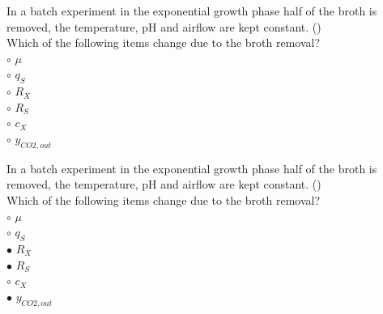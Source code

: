 \documentclass[]{beamer}
\begin{document}
\begin{frame}[shrink] {}
\color{blue}
In a batch experiment in the exponential growth phase half of the broth is removed, the temperature, pH and airflow are kept constant.
({\color{red}{Q7}})\\
Which of the following items change due to the broth removal?
\\
\color{black}
\setlength{\parindent}{-0.4cm}
{\color{red}$\circ$} $\mu$  \\
{\color{red}$\circ$} $q_{S}$  \\
{\color{red}$\circ$} $R_{X}$  \\
{\color{red}$\circ$} $R_{S}$  \\
{\color{red}$\circ$} $c_{X}$  \\
{\color{red}$\circ$} $y_{CO2,out}$  \\
\end{frame}
\begin{frame}[shrink] {}
\color{blue}
In a batch experiment in the exponential growth phase half of the broth is removed, the temperature, pH and airflow are kept constant.
({\color{green}{Q7}})\\
Which of the following items change due to the broth removal?
\\
\color{black}
\setlength{\parindent}{-0.4cm}
{\color{red}$\circ$} $\mu$  \\
{\color{red}$\circ$} $q_{S}$  \\
{\color{red}$\bullet$} $R_{X}$  \\
{\color{red}$\bullet$} $R_{S}$  \\
{\color{red}$\circ$} $c_{X}$  \\
{\color{red}$\bullet$} $y_{CO2,out}$  \\
\end{frame}
\end{document}
